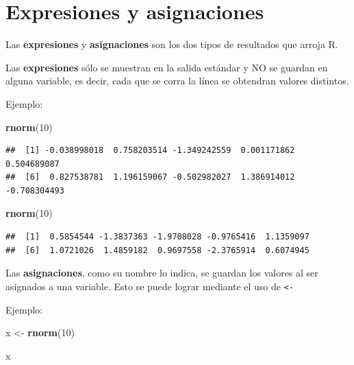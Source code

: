 \documentclass[
]{book}
\newenvironment{Shaded}{\begin{snugshade}}{\end{snugshade}}
\newcommand{\DecValTok}[1]{\textcolor[rgb]{0.00,0.00,0.81}{#1}}
\newcommand{\FunctionTok}[1]{\textcolor[rgb]{0.13,0.29,0.53}{\textbf{#1}}}
\newcommand{\NormalTok}[1]{#1}
\newcommand{\OtherTok}[1]{\textcolor[rgb]{0.56,0.35,0.01}{#1}}
\begin{document}
\section{Expresiones y asignaciones}\label{expresiones-y-asignaciones}

Las \textbf{expresiones} y \textbf{asignaciones} son los dos tipos de resultados que arroja R.

Las \textbf{expresiones} sólo se muestran en la salida estándar y NO se guardan en alguna variable, es decir, cada que se corra la línea se obtendran valores distintos.

Ejemplo:

\begin{Shaded}
\begin{Highlighting}[]
\FunctionTok{rnorm}\NormalTok{(}\DecValTok{10}\NormalTok{)}
\end{Highlighting}
\end{Shaded}

\begin{verbatim}
##  [1] -0.038998018  0.758203514 -1.349242559  0.001171862  0.504689087
##  [6]  0.827538781  1.196159067 -0.502982027  1.386914012 -0.708304493
\end{verbatim}

\begin{Shaded}
\begin{Highlighting}[]
\FunctionTok{rnorm}\NormalTok{(}\DecValTok{10}\NormalTok{)}
\end{Highlighting}
\end{Shaded}

\begin{verbatim}
##  [1]  0.5854544 -1.3837363 -1.9708028 -0.9765416  1.1359097
##  [6]  1.0721026  1.4859182  0.9697558 -2.3765914  0.6074945
\end{verbatim}

Las \textbf{asignaciones}, como su nombre lo indica, se guardan los valores al ser asignados a una variable. Esto se puede lograr mediante el uso de \texttt{\textless{}-}

Ejemplo:

\begin{Shaded}
\begin{Highlighting}[]
\NormalTok{x }\OtherTok{\textless{}{-}} \FunctionTok{rnorm}\NormalTok{(}\DecValTok{10}\NormalTok{)}
\end{Highlighting}
\end{Shaded}

\begin{Shaded}
\begin{Highlighting}[]
\NormalTok{x}
\end{Highlighting}
\end{Shaded}
\end{document}
